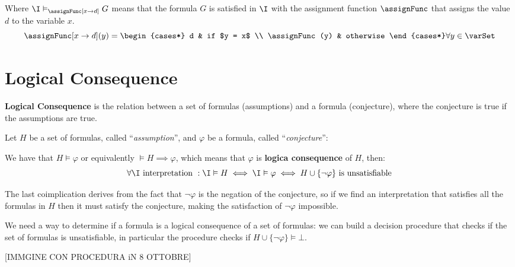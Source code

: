 Where $\I \vDash_{\assignFunc[x\rightarrow d]} G$ means that the formula $G$ is satisfied in $\I$
with the assignment function $\assignFunc$ that assigns the value $d$ to the variable $x$.
\begin{equation*}
    \assignFunc[x\rightarrow d](y) = 
    \begin{cases*}
        d & if $y = x$ \\
        \assignFunc(y) & otherwise
    \end{cases*}
    \forall y \in \varSet
\end{equation*}

\section{Logical Consequence}
\label{sec:Logical Consequence}

\textbf{Logical Consequence} is the relation between a set of formulas (assumptions) and 
a formula (conjecture), where the conjecture is true if the assumptions are true.

Let $H$ be a set of formulas, called ``\textit{assumption}'',
and $\varphi$ be a formula, called ``\textit{conjecture}'':

We have that $H \vDash \varphi$ or equivalently $\vDash H \implies \varphi$,
which means that $\varphi$ is \textbf{logica consequence} of $H$, then:
\begin{equation*}
    \forall \I \text{ interpretation }: \I \vDash H 
    \iff \I \vDash \varphi \iff H \cup \{\neg \varphi\} \text{ is unsatisfiable}
\end{equation*}

The last coimplication derives from the fact that $\neg \varphi$ is the negation of 
the conjecture, so if we find an interpretation that satisfies all the formulas in $H$ 
then it must satisfy the conjecture, making the satisfaction of 
$\neg \varphi$ impossible.

We need a way to determine if a formula is a logical consequence of a set of formulas:
we can build a decision procedure that checks if the set of formulas is unsatisfiable,
in particular the procedure checks if $H \cup \{\neg \varphi\} \vDash \bot$.

[IMMGINE CON PROCEDURA iN 8 OTTOBRE]
